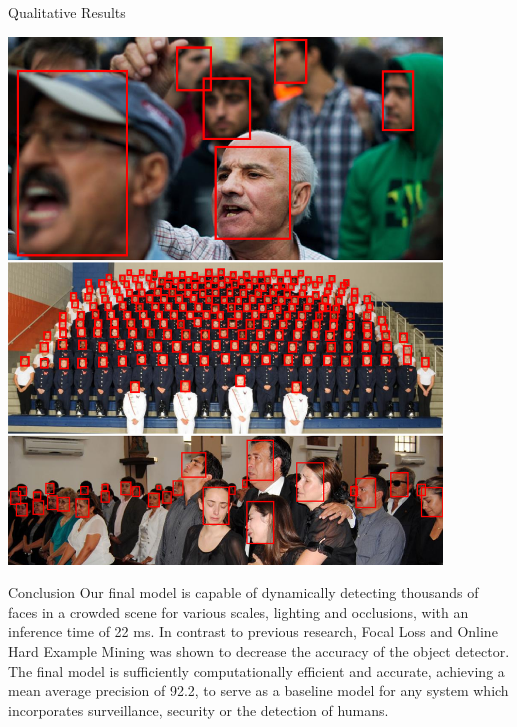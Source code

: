 \documentclass[paperwidth=24in,paperheight=48in, fontscale=0.4166666666666]{baposter}
\begin{document}
\begin{poster}
\begin{posterbox}[name=results,column=1,below=imagecaptioning]{Qualitative Results}
\begin{center}
\begin{minipage}{\textwidth}
\begin{center}
  \includegraphics[width=11.5cm]{bigface3.png}
  \vspace{-15pt}
  \label{figimagecaptioning}
\end{center}
\end{minipage}
\end{center}

\end{posterbox}
















\begin{posterbox}[name=conclusion,column=1,below=results]{Conclusion}
Our final model is capable of dynamically detecting thousands of faces in a crowded scene for various scales, lighting and occlusions, with an inference time of 22 ms. In contrast to previous research, Focal Loss and Online Hard Example Mining was shown to decrease the accuracy of the object detector. The final model is sufficiently computationally efficient and accurate, achieving a mean average precision of 92.2, to serve as a baseline model for any system which incorporates surveillance, security or the detection of humans.
\end{posterbox}









\end{poster}
\end{document}
